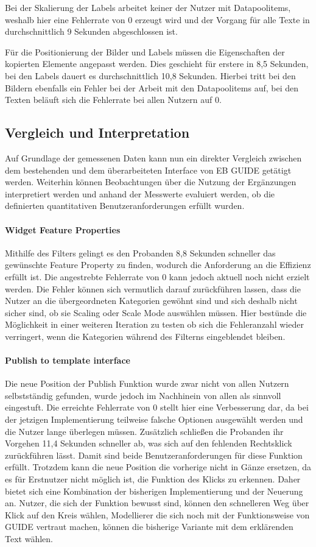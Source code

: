 Bei der Skalierung der Labels arbeitet keiner der Nutzer mit Datapoolitems, weshalb hier eine Fehlerrate von 0 erzeugt wird und der Vorgang für alle Texte in durchschnittlich 9 Sekunden abgeschlossen ist.

Für die Positionierung der Bilder und Labels müssen die Eigenschaften der kopierten Elemente angepasst werden.
Dies geschieht für erstere in 8,5 Sekunden, bei den Labels dauert es durchschnittlich 10,8 Sekunden.
Hierbei tritt bei den Bildern ebenfalls ein Fehler bei der Arbeit mit den Datapoolitems auf, bei den Texten beläuft sich die Fehlerrate bei allen Nutzern auf 0.

\subsection{Vergleich und Interpretation}Auf Grundlage der gemessenen Daten kann nun ein direkter Vergleich zwischen dem bestehenden und dem überarbeiteten Interface von EB GUIDE getätigt werden.
Weiterhin können Beobachtungen über die Nutzung der Ergänzungen interpretiert werden und anhand der Messwerte evaluiert werden, ob die definierten quantitativen Benutzeranforderungen erfüllt wurden.

\paragraph{Widget Feature Properties}
Mithilfe des Filters gelingt es den Probanden 8,8 Sekunden schneller das gewünschte Feature Property zu finden, wodurch die Anforderung an die Effizienz erfüllt ist.
Die angestrebte Fehlerrate von 0 kann jedoch aktuell noch nicht erzielt werden.
Die Fehler können sich vermutlich darauf zurückführen lassen, dass die Nutzer an die übergeordneten Kategorien gewöhnt sind und sich deshalb nicht sicher sind, ob sie Scaling oder Scale Mode auswählen müssen.
Hier bestünde die Möglichkeit in einer weiteren Iteration zu testen ob sich die Fehleranzahl wieder verringert, wenn die Kategorien während des Filterns eingeblendet bleiben.

\paragraph{Publish to template interface}
Die neue Position der Publish Funktion wurde zwar nicht von allen Nutzern selbstständig gefunden, wurde jedoch im Nachhinein von allen als sinnvoll eingestuft.
Die erreichte Fehlerrate von 0 stellt hier eine Verbesserung dar, da bei der jetzigen Implementierung teilweise falsche Optionen ausgewählt werden und die Nutzer lange überlegen müssen.
Zusätzlich schließen die Probanden ihr Vorgehen 11,4 Sekunden schneller ab, was sich auf den fehlenden Rechtsklick zurückführen lässt.
Damit sind beide Benutzeranforderungen für diese Funktion erfüllt.
Trotzdem kann die neue Position die vorherige nicht in Gänze ersetzen, da es für Erstnutzer nicht möglich ist, die Funktion des Klicks zu erkennen.
Daher bietet sich eine Kombination der bisherigen Implementierung und der Neuerung an.
Nutzer, die sich der Funktion bewusst sind, können den schnelleren Weg über Klick auf den Kreis wählen, Modellierer die sich noch mit der Funktionsweise von GUIDE vertraut machen, können die bisherige Variante mit dem erklärenden Text wählen.


